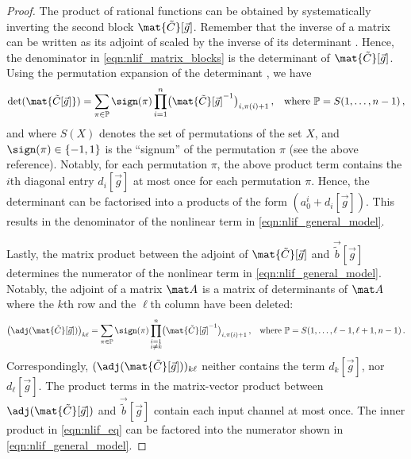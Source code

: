 \begin{proof}
The product of rational functions can be obtained by systematically inverting the second block $\mat{\tilde C}[\vec g]$.
Remember that the inverse of a matrix can be written as its adjoint of scaled by the inverse of its determinant \citep[e.g.,][Theorem~1.9, p.~366]{hefferon2020linear}.
Hence, the denominator in \cref{eqn:nlif_matrix_blocks} is the determinant of $\mat{\tilde C}[\vec g]$.
Using the permutation expansion of the determinant \citep[e.g.,][Section~4.I.3, p.~337]{hefferon2020linear}, we have
\begin{align*}
	\det(\mat{\tilde C[\vec g]})
		&= \sum_{\pi \in \mathbb{P}} \sign(\pi) \prod_{i=1}^n \bigl( \mat{\tilde C}[\vec g]^{-1} \bigr)_{i, \pi(i) + 1} \,,
	& \text{where } \mathbb{P} = S({1, \ldots, n - 1}) \,,
\end{align*}
and where $S(X)$ denotes the set of permutations of the set $X$, and $\sign(\pi) \in \{-1, 1\}$ is the \enquote{signum} of the permutation $\pi$ (see the above reference).
Notably, for each permutation $\pi$, the above product term contains the $i$th diagonal entry $d_i[\vec g]$ at most once for each permutation $\pi$.
Hence, the determinant can be factorised into a products of the form $(a_0^i + d_i[\vec g])$.
This results in the denominator of the nonlinear term in \cref{eqn:nlif_general_model}.

Lastly, the matrix product between the adjoint of $\mat{\tilde C}[\vec g]$ and $\vec{\tilde b}[\vec g]$ determines the numerator of the nonlinear term in \cref{eqn:nlif_general_model}.
Notably, the adjoint of a matrix $\mat A$ is a matrix of determinants of $\mat A$ where the $k$th row and the $\ell$th column have been deleted:
\begin{align*}
	\bigl(\adj(\mat{\tilde C}[\vec g])\bigr)_{k\ell}
		&= \sum_{\pi \in \mathbb{P}} \sign(\pi) \prod_{\substack{i=1\\i \neq k}}^n \bigl( \mat{\tilde C}[\vec g]^{-1} \bigr)_{i, \pi(i) + 1} \,,
	& \text{where } \mathbb{P} = S({1, \ldots, \ell - 1, \ell + 1, n - 1}) \,.
\end{align*}
Correspondingly, $(\adj(\mat{\tilde C}[\vec g]))_{k\ell}$ neither contains the term $d_{k}[\vec g]$, nor $d_{\ell}[\vec g]$.
The product terms in the matrix-vector product between $\adj(\mat{\tilde C}[\vec g])$ and $\vec{\tilde b}[\vec g]$ contain each input channel at most once.
The inner product in \cref{eqn:nlif_eq} can be factored into the numerator shown in \cref{eqn:nlif_general_model}.
\end{proof}

